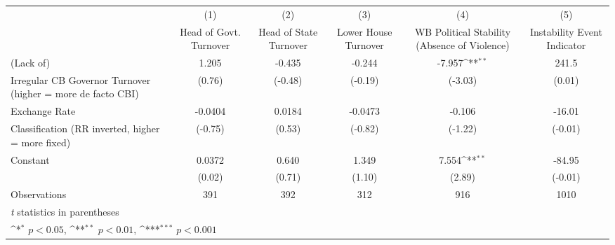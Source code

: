 {
\def\sym#1{\ifmmode^{#1}\else\(^{#1}\)\fi}
\begin{tabular}{l*{5}{c}}
\toprule
                &\multicolumn{1}{c}{(1)}&\multicolumn{1}{c}{(2)}&\multicolumn{1}{c}{(3)}&\multicolumn{1}{c}{(4)}&\multicolumn{1}{c}{(5)}\\
                &\multicolumn{1}{c}{Head of Govt. Turnover}&\multicolumn{1}{c}{Head of State Turnover}&\multicolumn{1}{c}{Lower House Turnover}&\multicolumn{1}{c}{WB Political Stability (Absence of Violence)}&\multicolumn{1}{c}{Instability Event Indicator}\\
\midrule
(Lack of)       &    1.205         &   -0.435         &   -0.244         &   -7.957\sym{**} &    241.5         \\
Irregular CB Governor Turnover (higher = more de facto CBI)&   (0.76)         &  (-0.48)         &  (-0.19)         &  (-3.03)         &   (0.01)         \\
\addlinespace
Exchange Rate   &  -0.0404         &   0.0184         &  -0.0473         &   -0.106         &   -16.01         \\
Classification (RR inverted, higher = more fixed)&  (-0.75)         &   (0.53)         &  (-0.82)         &  (-1.22)         &  (-0.01)         \\
\addlinespace
Constant        &   0.0372         &    0.640         &    1.349         &    7.554\sym{**} &   -84.95         \\
                &   (0.02)         &   (0.71)         &   (1.10)         &   (2.89)         &  (-0.01)         \\
\midrule
Observations    &      391         &      392         &      312         &      916         &     1010         \\
\bottomrule
\multicolumn{6}{l}{\footnotesize \textit{t} statistics in parentheses}\\
\multicolumn{6}{l}{\footnotesize \sym{*} \(p<0.05\), \sym{**} \(p<0.01\), \sym{***} \(p<0.001\)}\\
\end{tabular}
}
